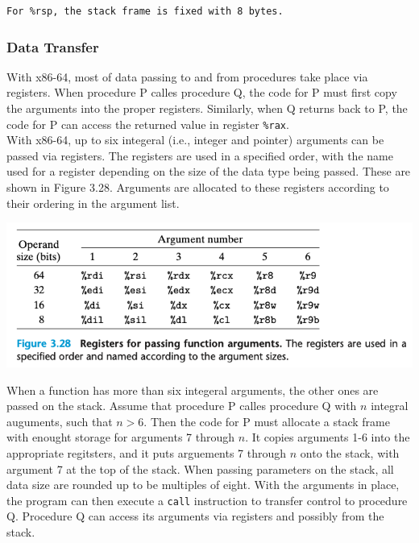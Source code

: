 \documentclass[11pt]{article}
\begin{document}
\begin{verbatim}
For %rsp, the stack frame is fixed with 8 bytes.
\end{verbatim}

\subsubsection{Data Transfer}
\label{sec:org0bfb2a2}
With x86-64, most of data passing to and from procedures take place via registers. When procedure P calles procedure Q, the code for P must first copy the arguments into the proper registers. Similarly, when Q returns back to P, the code for P can access the returned value in register \texttt{\%rax}.\\

With x86-64, up to six integeral (i.e., integer and pointer) arguments can be passed via registers. The registers are used in a specified order, with the name used for a register depending on the size of the data type being passed. These are shown in Figure 3.28. Arguments are allocated to these registers according to their ordering in the argument list.\\

\begin{center}
\includegraphics[width=.9\linewidth]{pics/registers-for-passing-function-arguments.png}
\end{center}

When a function has more than six integeral arguments, the other ones are passed on the stack. Assume that procedure P calles procedure Q with \(n\) integral auguments, such that \(n > 6\). Then the code for P must allocate a stack frame with enought storage for arguments 7 through \(n\). It copies arguments 1-6 into the appropriate regitsters, and it puts arguements 7 through \(n\) onto the stack, with argument 7 at the top of the stack. When passing parameters on the stack, all data size are rounded up to be multiples of eight. With the arguments in place, the program can then execute a \texttt{call} instruction to transfer control to procedure Q. Procedure Q can access its arguments via registers and possibly from the stack.\\
\end{document}
